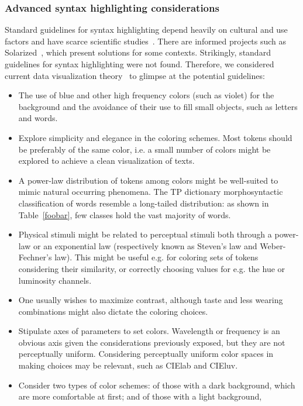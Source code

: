 \subsubsection{Advanced syntax highlighting considerations}
Standard guidelines for syntax highlighting
depend heavily on cultural and use factors
and have scarce scientific studies~\cite{stack}.
There are informed projects such as Solarized~\cite{solarized},
which present solutions for some contexts.
Strikingly, standard guidelines for syntax highlighting were not found.
Therefore, we considered current data visualization
theory~\cite{dv1,dv2,dv3,dv4} to glimpse at the potential guidelines:
\begin{itemize}
  \item The use of blue and other high frequency colors (such as
    violet) for the background and the avoidance of their use
  to fill small objects, such as letters and words.
  \item Explore simplicity and elegance in the  coloring schemes.
    Most tokens should be preferably of the same color, i.e.
    a small number of colors might be explored to achieve a clean
    visualization of texts.
  \item A power-law distribution of tokens among colors might be
    well-suited to mimic natural occurring phenomena.
    The TP dictionary morphosyntactic classification of words
    resemble a long-tailed distribution: as shown in Table~\ref{foobar},
    few classes hold the vast majority of words.
  \item Physical stimuli might be related to perceptual stimuli both 
    through a power-law or an exponential law (respectively known
    as Steven's law and Weber-Fechner's law).
    This might be useful e.g. for coloring sets of tokens
    considering their similarity, or correctly choosing values
    for e.g. the hue or luminosity channels.
  \item One usually wishes to maximize contrast,
  although taste and less wearing combinations might
  also dictate the coloring choices.
  \item Stipulate axes of parameters to set colors.
  Wavelength or frequency is an obvious axis given the considerations
    previously exposed, but they are not perceptually uniform.
    Considering perceptually uniform color spaces in making
    choices may be relevant, such as CIElab and CIEluv.
  \item Consider two types of color schemes: of those with a dark background,
  which are more comfortable at first; and of those with a light background,

\end{itemize}
